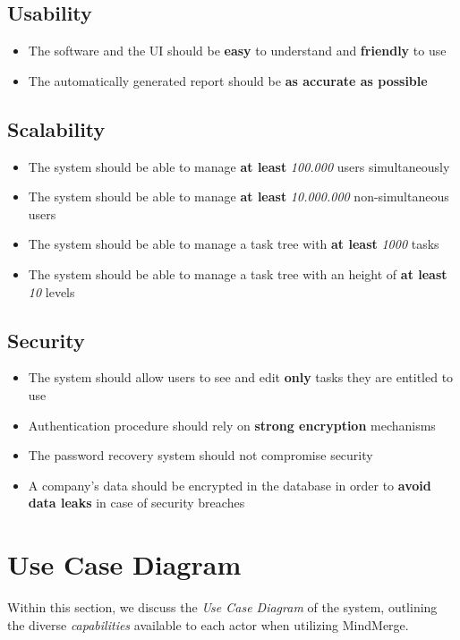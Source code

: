 \documentclass{article}
\begin{document}
\subsection{Usability}
\begin{itemize}
    \item The software and the UI should be \textbf{easy} to understand and \textbf{friendly} to use
    \item The automatically generated report should be \textbf{as accurate as possible}
\end{itemize}

\subsection{Scalability}
\begin{itemize}
    \item The system should be able to manage \textbf{at least} \textit{100.000} users simultaneously
    \item The system should be able to manage \textbf{at least} \textit{10.000.000} non-simultaneous users
    \item The system should be able to manage a task tree with \textbf{at least} \textit{1000} tasks
    \item The system should be able to manage a task tree with an height of \textbf{at least} \textit{10} levels
\end{itemize}

\subsection{Security}
\begin{itemize}
    \item The system should allow users to see and edit \textbf{only} tasks they are entitled to use
    \item Authentication procedure should rely on \textbf{strong encryption} mechanisms
    \item The password recovery system should not compromise security
    \item A company's data should be encrypted in the database in order to \textbf{avoid data leaks} in case of security breaches
\end{itemize}
\pagebreak

\section{Use Case Diagram}
Within this section, we discuss the \textit{Use Case Diagram} of the system, outlining the diverse \textit{capabilities} available to each actor when utilizing MindMerge.
\end{document}
